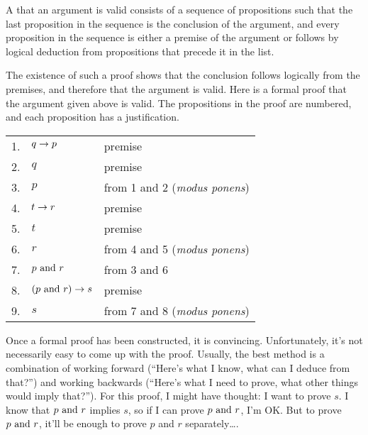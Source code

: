 \begin{definition}
A  that an argument is valid consists of a
sequence of propositions such that the last proposition in the
sequence is the conclusion of the argument, and every proposition
in the sequence is either a premise of the argument or follows
by logical deduction from propositions that precede it in the list.
\end{definition}

The existence of such a proof shows that the conclusion follows
logically from the premises, and therefore that the argument is 
valid.  Here is a formal proof that the argument given above is valid.
The propositions in the proof are numbered, and each proposition
has a justification.
\begin{center}
  \begin{tabular}{r@{\ \ }l@{\qquad}l}
     1.&$q\rightarrow p$&    premise\\
     2.&$q$&          premise\\
     3.&$p$&          from 1 and 2 (\textit{modus ponens})\\
     4.&$t\rightarrow r$&    premise\\
     5.&$t$&          premise\\
     6.&$r$&          from 4 and 5 (\textit{modus ponens})\\
     7.&$p\text{ and } r$&    from 3 and 6\\
     8.&$(p\text{ and } r)\rightarrow s$& premise\\
     9.&$s$&          from 7 and 8 (\textit{modus ponens})\\
  \end{tabular}
\end{center}
Once a formal proof has been constructed, it is convincing.  Unfortunately,
it's not necessarily easy to come up with the proof.  Usually, the best
method is a combination of working forward (``Here's what I know, what
can I deduce from that?'') and working backwards (``Here's what I
need to prove, what other things would imply that?'').  For this proof,
I might have thought:  I want to prove $s$.  I know that
$p\text{ and } r$ implies $s$, so if I can prove $p\text{ and } r$, I'm OK.
But to prove $p\text{ and } r$, it'll be enough to prove $p$ and $r$ 
separately\dots.

